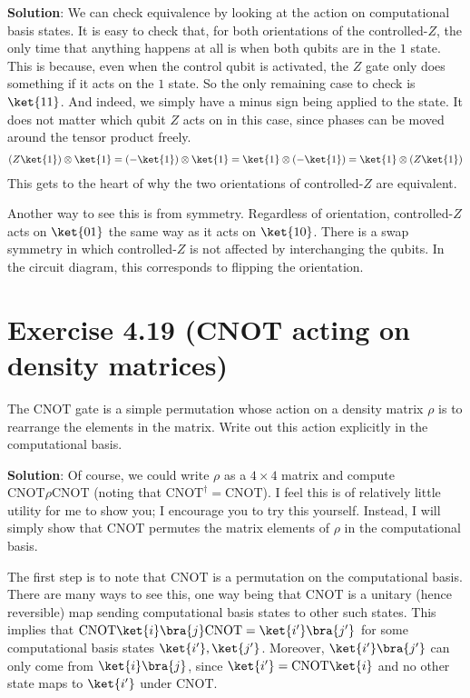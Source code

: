 \documentclass{book}
\begin{document}
    \textbf{Solution}: We can check equivalence by looking at the action on computational basis states. It is easy to check that, for both orientations of the controlled-$Z$, the only time that anything happens at all is when both qubits are in the $1$ state. This is because, even when the control qubit is activated, the $Z$ gate only does something if it acts on the $1$ state. So the only remaining case to check is $\ket{11}$. And indeed, we simply have a minus sign being applied to the state. It does not matter which qubit $Z$ acts on in this case, since phases can be moved around the tensor product freely.
    \begin{align}
        (Z\ket{1}) \otimes \ket{1} = (-\ket{1}) \otimes \ket{1} = \ket{1} \otimes (-\ket{1}) = \ket{1} \otimes (Z\ket{1})
    \end{align}
    This gets to the heart of why the two orientations of controlled-$Z$ are equivalent. 

    Another way to see this is from symmetry. Regardless of orientation, controlled-$Z$ acts on $\ket{01}$ the same way as it acts on $\ket{10}$. There is a swap symmetry in which controlled-$Z$ is not affected by interchanging the qubits. In the circuit diagram, this corresponds to flipping the orientation.

\section*{Exercise 4.19 (CNOT acting on density matrices)}
    The $\mathrm{CNOT}$ gate is a simple permutation whose action on a density matrix $\rho$ is to rearrange the elements in the matrix. Write out this action explicitly in the computational basis. 

    \textbf{Solution}: Of course, we could write $\rho$ as a $4 \times 4$ matrix and compute $\mathrm{CNOT} \rho \mathrm{CNOT}$ (noting that $\mathrm{CNOT}^\dagger = \mathrm{CNOT}$). I feel this is of relatively little utility for me to show you; I encourage you to try this yourself. Instead, I will simply show that $\mathrm{CNOT}$ permutes the matrix elements of $\rho$ in the computational basis. 

    The first step is to note that $\mathrm{CNOT}$ is a permutation on the computational basis. There are many ways to see this, one way being that $\mathrm{CNOT}$ is a unitary (hence reversible) map sending computational basis states to other such states. This implies that $\mathrm{CNOT}\ket{i}\bra{j}\mathrm{CNOT} = \ket{i'}\bra{j'}$ for some computational basis states $\ket{i'}, \ket{j'}$. Moreover, $\ket{i'}\bra{j'}$ can only come from $\ket{i}\bra{j}$, since $\ket{i'} = \mathrm{CNOT} \ket{i}$ and no other state maps to $\ket{i'}$ under $\mathrm{CNOT}$.
\end{document}

